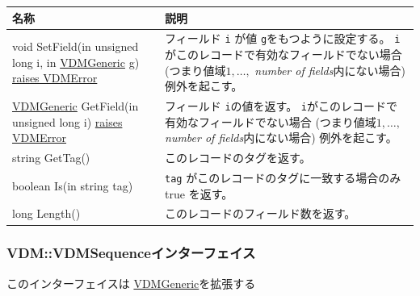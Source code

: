 \documentclass[\pformat,12pt]{jarticle}
\newcommand{\pbs}[1]{\let\temp=\\#1\let\\=\temp}
\newenvironment{interfacetable}{%
  \begin{longtable}{|>{\pbs\raggedright\ttfamily}p{6.6cm}%
                    |>{\pbs\raggedright}p{6.6cm}|} \hline
  \textrm{\bfseries 名称} &  \textbf{説明} \\ \hline
  \endhead
  }{\end{longtable}}
\newcommand{\APIError}{\hyperlink{exception.APIError}{raises APIError}}
\newcommand{\VDMError}{\hyperlink{exception.VDMError}{raises VDMError}}
\newcommand{\VDMGeneric}{\hyperlink{interface.Generic}{VDMGeneric}}
\begin{document}
\begin{interfacetable}
void SetField(in unsigned long i, in {\VDMGeneric} g) {\VDMError}
 & フィールド \texttt{i} が値 \texttt{g}をもつように設定する。
    \texttt{i}がこのレコードで有効なフィールドでない場合
    (つまり値域$1,\ldots,$ \textit{number of fields}内にない場合) 
    例外を起こす。
\\ \hline
{\VDMGeneric} GetField(in unsigned long i) {\VDMError}
 & フィールド \texttt{i}の値を返す。
    \texttt{i}がこのレコードで有効なフィールドでない場合
    (つまり値域$1,\ldots,$ \textit{number of fields}内にない場合) 
    例外を起こす。
\\ \hline
string GetTag() %
 & このレコードのタグを返す。
\\ \hline
boolean Is(in string tag)
 &  \texttt{tag} がこのレコードのタグに一致する場合のみ true を返す。
\\ \hline
long Length()
 & このレコードのフィールド数を返す。
\\ \hline
\end{interfacetable}

\subsubsection{VDM::VDMSequenceインターフェイス}
\mbox{}
このインターフェイスは \hyperlink{interface.Generic}{VDMGeneric}を拡張する
\end{document}
